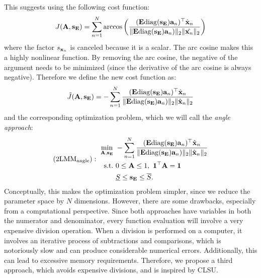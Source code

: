 This suggests using the following cost function:
\begin{equation}
J(\mathbf{A}, \mathbf{s}_{\mathbf{E}}) = \sum_{n=1}^N \arccos \left( \frac{(\mathbf{E} \mathrm{diag} (\mathbf{s}_{\mathbf{E}}) \mathbf{a}_n)^\top \hat{\mathbf{x}}_n}{\|\mathbf{E} \mathrm{diag} (\mathbf{s}_{\mathbf{E}}) \mathbf{a}_n)\|_2 \|\hat{\mathbf{x}_n}\|_2 }\right)    
\end{equation}
where the factor $s_{\mathbf{x}_n}$ is canceled because it is a scalar. The arc cosine makes this a highly nonlinear function. By removing the arc cosine, the negative of the argument needs to be minimized (since the derivative of the arc cosine is always negative). Therefore we define the new cost function as:
\begin{equation} \label{eq: angle cost function}
    \Tilde{J}(\mathbf{A}, \mathbf{s}_{\mathbf{E}}) = - \sum_{n=1}^N \frac{(\mathbf{E} \mathrm{diag} (\mathbf{s}_{\mathbf{E}}) \mathbf{a}_n)^\top \hat{\mathbf{x}}_n}{\|\mathbf{E} \mathrm{diag} (\mathbf{s}_{\mathbf{E}}) \mathbf{a}_n)\|_2 \|\hat{\mathbf{x}}_n\|_2 }
\end{equation}
and the corresponding optimization problem, which we will call the \textit{angle approach}:
\begin{equation}
    (\mathrm{2LMM}_\mathrm{angle}):~
    \begin{aligned}
            \min_{\mathbf{A}, \mathbf{s}_{\mathbf{E}}} &~- \sum_{n=1}^N \frac{(\mathbf{E} \mathrm{diag} (\mathbf{s}_{\mathbf{E}}) \mathbf{a}_n)^\top \hat{\mathbf{x}}_n}{\|\mathbf{E} \mathrm{diag} (\mathbf{s}_{\mathbf{E}}) \mathbf{a}_n)\|_2 \|\hat{\mathbf{x}}_n\|_2 } \\
            \text{s.t.} &~ 0 \leq \mathbf{A} \leq 1,~\mathbf{1}^\top \mathbf{A} = \mathbf{1}  \\
                        &~ \underline{S} \leq \mathbf{s}_{\mathbf{E}} \leq \overline{S}.
    \end{aligned}
\end{equation}
Conceptually, this makes the optimization problem simpler, since we reduce the parameter space by $N$ dimensions. However, there are some drawbacks, especially from a computational perspective. Since both approaches have variables in both the numerator and denominator, every function evaluation will involve a very expensive division operation. When a division is performed on a computer, it involves an iterative process of subtractions and comparisons, which is notoriously slow \cite[Ch. 3.4]{patterson_computer_2017} and can produce considerable numerical errors. Additionally, this can lead to excessive memory requirements. Therefore, we propose a third approach, which avoids expensive divisions, and is inspired by CLSU.
